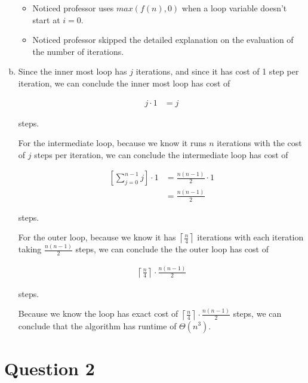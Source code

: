 \documentclass[12pt]{article}
\begin{document}
\begin{enumerate}[a.]
    \begin{itemize}
        \item Noticed professor uses $max(f(n),0)$ when a loop variable doesn't start
        at $i = 0$.

        \item Noticed professor skipped the detailed explanation on the evaluation of
        the number of iterations.

    \end{itemize}

    \item

    Since the inner most loop has $j$ iterations, and since it has cost of 1 step per
    iteration, we can conclude the inner most loop has cost of

    \setcounter{equation}{0}
    \begin{align}
        j \cdot 1 &= j
    \end{align}

    steps.

    \bigskip

    For the intermediate loop, because we know it runs $n$ iterations with the cost
    of $j$ steps per iteration, we can conclude the intermediate loop has cost
    of

    \begin{align}
        \left[ \sum\limits_{j=0}^{n-1} j \right] \cdot 1 &= \frac{n(n-1)}{2} \cdot 1\\
        &= \frac{n(n-1)}{2}
    \end{align}

    steps.

    \bigskip

    For the outer loop, because we know it has $\left\lceil \frac{n}{4} \right\rceil$ iterations
    with each iteration taking $\frac{n(n-1)}{2}$ steps, we can conclude the the outer
    loop has cost of

    \begin{align}
        \left\lceil \frac{n}{4} \right\rceil \cdot \frac{n(n-1)}{2}
    \end{align}

    steps.

    \bigskip

    Because we know the loop has exact cost of $\left\lceil \frac{n}{4}
    \right\rceil \cdot \frac{n(n-1)}{2}$ steps, we can conclude that the algorithm
    has runtime of $\Theta(n^3)$.

\end{enumerate}

\section*{Question 2}
\end{document}
